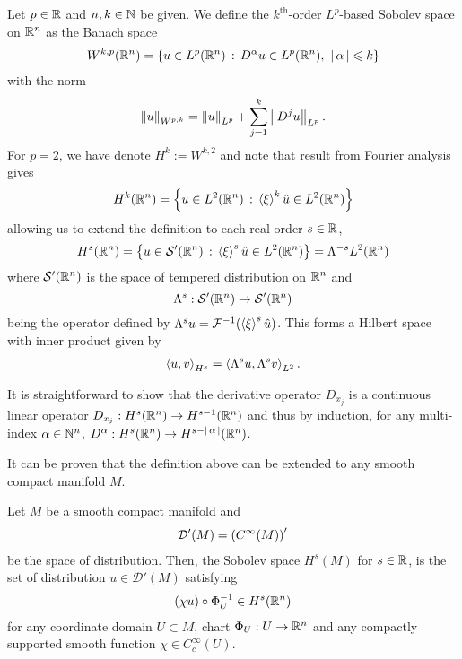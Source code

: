 \documentclass[12pt]{article}
\begin{document}
\begin{fdefinition}
    \cite[Chapter 4]{taylor_pde} Let $p \in \R$ and $n, k \in \N$ be given. We define the $k^{\text{th}}$-order $L^p$-based Sobolev space on $\R^n$ as the Banach space
    \begin{align*}
    W^{k, p}(\R^n) = \set{u \in L^p(\R^n) \wh D^\alpha u \in L^p(\R^n), \, \, \abs{\alpha} \leq k }
    \end{align*}
    with the norm
    \begin{align*}
    \norm[u]_{W^{p, k}} = \norm[u]_{L^p} + \sum_{j = 1}^k \norm[D^j u]_{L^p}. 
    \end{align*}
    For $p = 2$, we have denote $H^k := W^{k ,2}$ and note that result from Fourier analysis gives
    \begin{align*}
    H^k(\R^n) = \set{u \in L^2(\R^n) \wh \abrac{\xi}^k \hat{u} \in L^2(\R^n)}
    \end{align*}
    allowing us to extend the definition to each real order $s \in \R$, 
    \begin{align*}
    H^s(\R^n) = \set{u \in \sch'(\R^n) \wh \abrac{\xi}^s \hat{u} \in L^2(\R^n)} = \Lambda^{-s} L^2(\R^n) 
    \end{align*}
    where $\sch'(\R^n)$ is the space of tempered distribution on $\R^n$ and 
    $$\Lambda^s: \sch'(\R^n) \to \sch'(\R^n)$$
     being the operator defined by $\Lambda^su = \F^{-1}(\abrac{\xi}^s \hat{u})$. This forms a Hilbert space with inner product given by
    \begin{align*}
    \inprod[u, v]_{H^s} = \inprod[ \Lambda^su, \Lambda^sv]_{L^2}. 
    \end{align*}
\end{fdefinition}
\begin{rem}
    It is straightforward to show that the derivative operator $D_{x_j}$ is a continuous linear operator $D_{x_j}: H^s(\R^n) \to H^{s - 1}(\R^n)$ and thus by induction, for any multi-index $\alpha \in \N^n$, $D^{\alpha} : H^s(\R^n) \to H^{s - \abs{\alpha}}(\R^n)$. 
\end{rem}

It can be proven that \cite{taylor_pde} the definition above can be extended to any smooth compact manifold $M$. 
\begin{fdefinition}
    Let $M$ be a smooth compact manifold and 
    \begin{align*}
    \mathcal{D}'(M) = \brac{C^\infty(M)}'
    \end{align*}
    be the space of distribution. Then, the Sobolev space $H^s(M)$ for $s \in \R$, is the set of distribution $u \in \mathcal{D}'(M)$ satisfying
    \begin{align*}
    (\chi u) \circ \Phi_U^{-1}  \in H^{s}(\R^n)
    \end{align*}
    for any coordinate domain $U \subset M$, chart $\Phi_U: U \to \R^n$ and any compactly supported smooth function $\chi \in C^\infty_c(U)$. 
\end{fdefinition}
\end{document}
